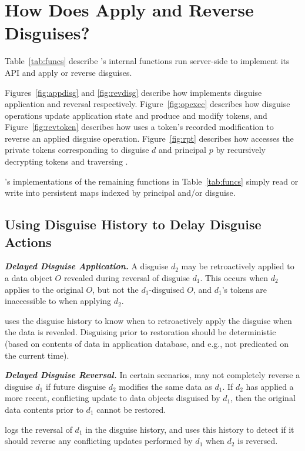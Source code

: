 \section{How Does \sys Apply and Reverse Disguises?}

Table~\ref{tab:funcs} describe \sys's internal functions run server-side to implement its API 
and apply or reverse disguises. 

Figures~\ref{fig:appdisg} and \ref{fig:revdisg} describe how \sys implements disguise application and
reversal respectively. Figure~\ref{fig:opexec} describes how disguise operations update application
state and produce and modify tokens, and 
Figure~\ref{fig:revtoken} describes how \sys uses a token's recorded
modification to reverse an applied disguise operation. 
Figure~\ref{fig:rpt} describes how \sys accesses the private tokens
corresponding to disguise $d$ and principal $p$ by recursively decrypting tokens and traversing
.

\sys's implementations of the remaining functions in Table~\ref{tab:funcs} simply read or write into
persistent maps indexed by principal and/or disguise.

\subsection{Using Disguise History to Delay Disguise Actions}

\noindent\textbf{\emph{Delayed Disguise Application.}}
A disguise $d_2$ may be retroactively applied to a data object $O$ revealed during reversal of
disguise $d_1$.  This occurs when $d_2$ applies to the original $O$, but not the $d_1$-disguised
$O$, and $d_1$'s tokens are inaccessible to \sys when applying $d_2$.

\sys uses the disguise history to know when to retroactively apply the
disguise when the data is revealed.  Disguising prior to restoration should be deterministic (based
on contents of data in application database, and e.g., not predicated on the current time).

\noindent\textbf{\emph{Delayed Disguise Reversal.}}
In certain scenarios, \sys may not completely reverse a disguise $d_1$ if future disguise $d_2$
modifies the same data as $d_1$. If $d_2$ has applied a more recent, conflicting update to data
objects disguised by $d_1$, then the original data contents prior to $d_1$ cannot be restored. 

\sys logs the reversal of $d_1$ in the disguise history, and uses this history to detect if it
should reverse any conflicting updates performed by $d_1$ when $d_2$ is reversed.

